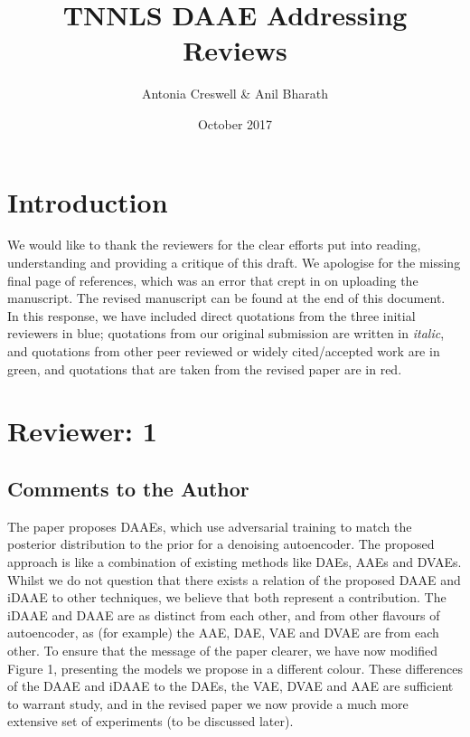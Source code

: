 \documentclass[a4paper,11pt]{article}
\title{TNNLS DAAE Addressing Reviews}
\author{Antonia Creswell \& Anil Bharath}
\date{October 2017}
\begin{document}
\maketitle
\section*{Introduction}
We would like to thank the reviewers for the clear efforts put into reading, understanding and providing a critique of this draft. We apologise for the missing final page of references, which was an error that crept in on uploading the manuscript.  The revised manuscript can be found at the end of this document. \\

In this response, we have included direct quotations from the three initial reviewers in {\color{blue}blue}; quotations from our original submission are written in {\em italic}, and quotations from other peer reviewed or widely cited/accepted work are in {\color{green}green}, and quotations that are taken from the revised paper are in {\color{red}red}.

\section*{Reviewer: 1}
\subsection*{Comments to the Author}
{\color{blue} The paper proposes DAAEs, which use adversarial training to match the posterior distribution to the prior for a denoising autoencoder. The proposed approach is like a combination of existing methods like DAEs, AAEs and DVAEs.}\\

Whilst we do not question that there exists a relation of the proposed DAAE and iDAAE to other techniques, we believe that both represent a contribution. The iDAAE and DAAE are as distinct from each other, and from other flavours of autoencoder, as (for example) the AAE, DAE, VAE and DVAE are from each other.  To ensure that the message of the paper clearer, we have now modified Figure 1, presenting the models we propose in a different colour.  These differences of the DAAE and iDAAE to the DAEs, the VAE, DVAE and AAE are sufficient to warrant study, and in the revised paper we now provide a much more extensive set of experiments (to be discussed later).\\
\end{document}
